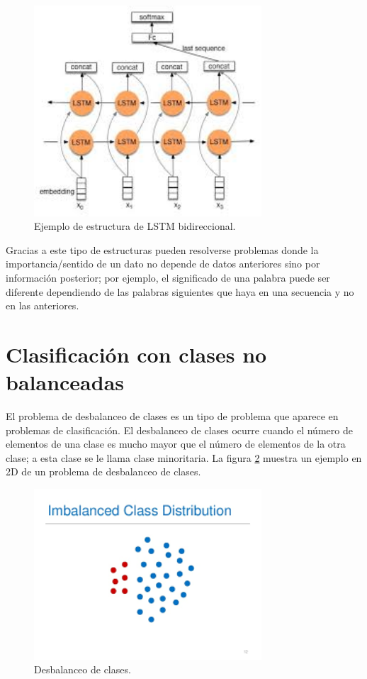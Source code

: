 \begin{figure}[H]
	\centering
	\includegraphics[width=85mm]{imagenes/bidi-lstm.jpg}
	\caption{Ejemplo de estructura de LSTM bidireccional.}
	\label{fig:23}
\end{figure}
\verticalspace
Gracias a este tipo de estructuras pueden resolverse problemas donde la importancia/sentido de un dato no depende de datos anteriores sino por información posterior; por ejemplo, el significado de una palabra puede ser diferente dependiendo de las palabras siguientes que haya en una secuencia y no en las anteriores.
\newpage
\section{Clasificación con clases no balanceadas}
El problema de desbalanceo de clases es un tipo de problema que aparece en problemas de clasificación. El desbalanceo de clases ocurre cuando el número de elementos de una clase es mucho mayor que el número de elementos de la otra clase; a esta clase se le llama clase minoritaria. La figura \ref{fig:24} muestra un ejemplo en 2D de un problema de desbalanceo de clases.\newline

\begin{figure}[H]
	\centering
	\includegraphics[width=85mm]{imagenes/imbalance_class.png}
	\caption{Desbalanceo de clases.}
	\label{fig:24}
\end{figure}
\verticalspace

